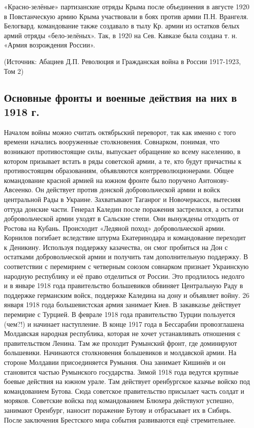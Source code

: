 «Красно-зелёные» партизанские отряды Крыма после объединения в августе 1920 в Повстанческую армию Крыма участвовали в боях против армии П.Н. Врангеля.
Белогвард. командование также создавало в тылу Кр. армии из остатков белых армий отряды «бело-зелёных». Так, в 1920 на Сев. Кавказе была создана т. н. «Армия возрождения России».

(Источник: Абациев Д.П. Революция и Гражданская война в России 1917-1923, Том 2)

\subsection{Основные фронты и военные действия на них в 1918 г.}

Началом войны можно считать октябрьский переворот, так как именно с того времени начались вооруженные столкновения. Совнарком, понимая, что возникают противостоящие силы, выпускает обращение ко всему населению, в котором призывает встать в ряды советской армии, а те, кто будут причастны к противостоящим образованиям, объявляются контрреволюционерами.
Общее командование красной армией на южном фронте было поручено Антонову-Авсеенко. Он действует против донской добровольческой армии и войск центральной Рады в Украине. Захватывают Таганрог и Новочеркасск, вытесняя оттуда донские части. Генерал Каледин после поражения застрелился, а остатки добровольческой армии уходят в Сальские степи. Они вынуждены отходить от Ростова на Кубань. Происходит «Ледяной поход» добровольческой армии. Корнилов погибает вследствие штурма Екатеринодара и командование переходит к Деникину. Используя поддержку казачества, он смог пробиться на Дон с остатками добровольческой армии и получить там дополнительную поддержку. 
В соответствии с перемирием с четверным союзом совнарком признает Украинскую народную республику и её право отделиться от России. Это продлилось недолго и в январе 1918 года правительство большевиков обвиняет Центральную Раду в поддержке германским войск, поддержке Каледина на дону и объявляет войну. 26 января 1918 года большевистская армия занимает Киев.
В закавказье действует перемирие с Турцией. В феврале 1918 года правительство Турции пользуется (чем?!) и начинает наступление.
В конце 1917 года в Бессарабии провозглашена Молдавская народная республика, которая не хочет устанавливать отношения с правительством Ленина. Там же проходит Румынский фронт, где доминируют большевики. Начинаются столкновения большевиков и молдавской армии. На стороне Молдавии присоединяется Румыния. Она занимает Кишинёв и он становится частью Румынского государства.
Зимой 1918 года ведутся крупные боевые действия на южном урале. Там действует оренбургское казачье войско под командованием Бутова. Сюда советское правительство присылает часть солдат и моряков. Советские войска под командованием Блюхера действуют успешно, занимают Оренбург, наносит поражение Бутову и отбрасывает их в Сибирь.
После заключения Брестского мира события развиваются ещё стремительнее.

